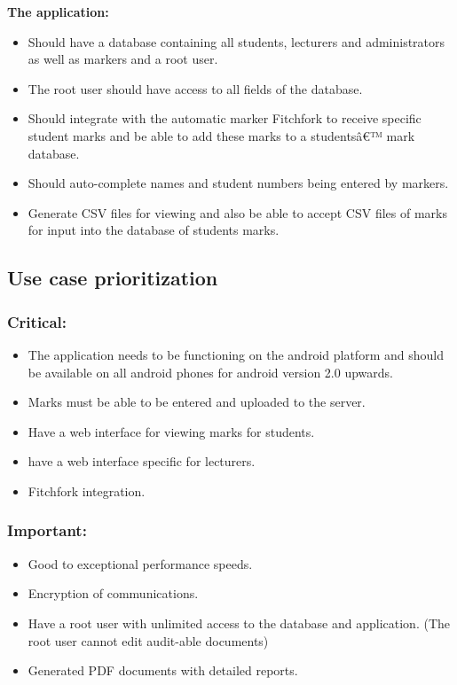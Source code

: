 \documentclass[11pt,a4paper]{article}
\begin{document}
\textbf{The application:}
\begin{itemize}
\item Should have a database containing all students, lecturers and administrators as well as markers and a root user.
\item The root user should have access to all fields of the database. 
\item Should integrate with the automatic marker Fitchfork to receive specific student marks and be able to add these marks to a studentsâ€™ mark database.
\item Should auto-complete names and student numbers being entered by markers. 
\item Generate CSV files for viewing and also be able to accept CSV files of marks for input into the database of students marks.

\end{itemize}

\subsection{Use case prioritization}

\subsubsection{Critical: }
\begin{itemize}
\item The application needs to be functioning on the android platform and should be available on all android phones for android version 2.0 upwards.
\item Marks must be able to be entered and uploaded to the server.
\item Have a web interface for viewing marks for students.
\item have a web interface specific for lecturers.
\item Fitchfork integration.
\end{itemize}

\subsubsection{Important: } 
\begin{itemize}
\item Good to exceptional performance speeds.
\item Encryption of communications.
\item Have a root user with unlimited access to the database and application. (The root user cannot edit audit-able documents)
\item Generated PDF documents with detailed reports.
\end{itemize}
\end{document}
